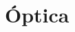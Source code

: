\documentclass[12pt, a4paper, twoside]{book}
\begin{document}
\chapter{Óptica}

% 
% 
% 

% 
% 
% 

% 
% 
% 

% 
% 
% 

% 
% 
% 

\end{document}
